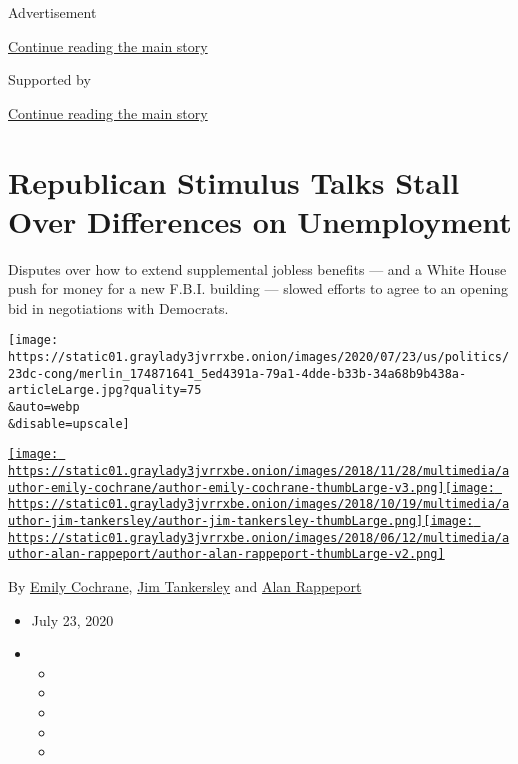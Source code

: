 Advertisement

\protect\hyperlink{after-top}{Continue reading the main story}

Supported by

\protect\hyperlink{after-sponsor}{Continue reading the main story}

\hypertarget{republican-stimulus-talks-stall-over-differences-on-unemployment}{%
\section{Republican Stimulus Talks Stall Over Differences on
Unemployment}\label{republican-stimulus-talks-stall-over-differences-on-unemployment}}

Disputes over how to extend supplemental jobless benefits --- and a
White House push for money for a new F.B.I. building --- slowed efforts
to agree to an opening bid in negotiations with Democrats.

\texttt{[image: https://static01.graylady3jvrrxbe.onion/images/2020/07/23/us/politics/23dc-cong/merlin\_174871641\_5ed4391a-79a1-4dde-b33b-34a68b9b438a-articleLarge.jpg?quality=75\\\&auto=webp\\\&disable=upscale]}

\href{https://www.nytimes3xbfgragh.onion/by/emily-cochrane}{\texttt{[image: https://static01.graylady3jvrrxbe.onion/images/2018/11/28/multimedia/author-emily-cochrane/author-emily-cochrane-thumbLarge-v3.png]}}\href{https://www.nytimes3xbfgragh.onion/by/jim-tankersley}{\texttt{[image: https://static01.graylady3jvrrxbe.onion/images/2018/10/19/multimedia/author-jim-tankersley/author-jim-tankersley-thumbLarge.png]}}\href{https://www.nytimes3xbfgragh.onion/by/alan-rappeport}{\texttt{[image: https://static01.graylady3jvrrxbe.onion/images/2018/06/12/multimedia/author-alan-rappeport/author-alan-rappeport-thumbLarge-v2.png]}}

By \href{https://www.nytimes3xbfgragh.onion/by/emily-cochrane}{Emily
Cochrane},
\href{https://www.nytimes3xbfgragh.onion/by/jim-tankersley}{Jim
Tankersley} and
\href{https://www.nytimes3xbfgragh.onion/by/alan-rappeport}{Alan
Rappeport}

\begin{itemize}
\item
  July 23, 2020
\item
  \begin{itemize}
  \item
  \item
  \item
  \item
  \item
  \end{itemize}
\end{itemize}

